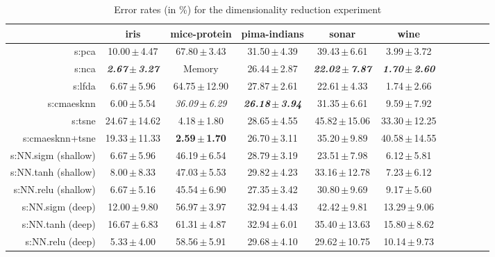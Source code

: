 \begin{table}[ht]
{\begin{tabular}{rcccccccccc}
\midrule
& \multicolumn{1}{c}{iris} & \multicolumn{1}{c}{mice-protein} & \multicolumn{1}{c}{pima-indians} & \multicolumn{1}{c}{sonar} & \multicolumn{1}{c}{wine} \\ 
\midrule
s:\ac{pca} & 10.00\,$\pm$\,4.47 & 67.80\,$\pm$\,3.43 & 31.50\,$\pm$\,4.39 & 39.43\,$\pm$\,6.61 & 3.99\,$\pm$\,3.72 \\
s:\ac{nca} & \emph{\textbf{2.67\,$\pm$\,3.27}} & Memory  & 26.44\,$\pm$\,2.87 & \emph{\textbf{22.02\,$\pm$\,7.87}} & \emph{\textbf{1.70\,$\pm$\,2.60}} \\
s:\ac{lfda} & 6.67\,$\pm$\,5.96 & 64.75\,$\pm$\,12.90 & 27.87\,$\pm$\,2.61 & 22.61\,$\pm$\,4.33 & 1.74\,$\pm$\,2.66 \\
s:\ac{cmaesknn} & 6.00\,$\pm$\,5.54 & \emph{36.09\,$\pm$\,6.29} & \emph{\textbf{26.18\,$\pm$\,3.94}} & 31.35\,$\pm$\,6.61 & 9.59\,$\pm$\,7.92 \\
s:\ac{tsne} & 24.67\,$\pm$\,14.62 & 4.18\,$\pm$\,1.80 & 28.65\,$\pm$\,4.55 & 45.82\,$\pm$\,15.06 & 33.30\,$\pm$\,12.25 \\
s:\ac{cmaesknn}+\ac{tsne} & 19.33\,$\pm$\,11.33 & \textbf{2.59\,$\pm$\,1.70} & 26.70\,$\pm$\,3.11 & 35.20\,$\pm$\,9.89 & 40.58\,$\pm$\,14.55 \\
s:NN.\ac{sigm} (shallow) & 6.67\,$\pm$\,5.96 & 46.19\,$\pm$\,6.54 & 28.79\,$\pm$\,3.19 & 23.51\,$\pm$\,7.98 & 6.12\,$\pm$\,5.81 \\
s:NN.\ac{tanh} (shallow) & 8.00\,$\pm$\,8.33 & 47.03\,$\pm$\,5.53 & 29.82\,$\pm$\,4.23 & 33.16\,$\pm$\,12.78 & 7.23\,$\pm$\,6.12 \\
s:NN.\ac{relu} (shallow) & 6.67\,$\pm$\,5.16 & 45.54\,$\pm$\,6.90 & 27.35\,$\pm$\,3.42 & 30.80\,$\pm$\,9.69 & 9.17\,$\pm$\,5.60 \\
s:NN.\ac{sigm} (deep) & 12.00\,$\pm$\,9.80 & 56.97\,$\pm$\,3.97 & 32.94\,$\pm$\,4.43 & 42.42\,$\pm$\,9.81 & 13.29\,$\pm$\,9.06 \\
s:NN.\ac{tanh} (deep) & 16.67\,$\pm$\,6.83 & 61.31\,$\pm$\,4.87 & 32.94\,$\pm$\,6.01 & 35.40\,$\pm$\,13.63 & 15.80\,$\pm$\,8.62 \\
s:NN.\ac{relu} (deep) & 5.33\,$\pm$\,4.00 & 58.56\,$\pm$\,5.91 & 29.68\,$\pm$\,4.10 & 29.62\,$\pm$\,10.75 & 10.14\,$\pm$\,9.73 \\


\bottomrule
\end{tabular}
}
\caption{Error rates (in \%) for the dimensionality reduction experiment} \label{tab:dim-error-rates}
\end{table}

